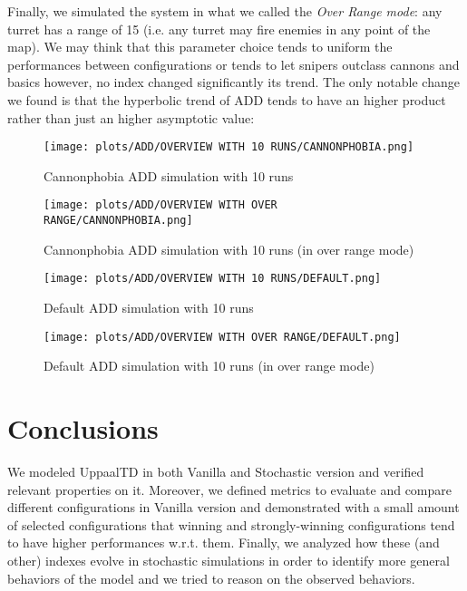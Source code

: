 \documentclass[
10pt, %
a4paper, %
oneside, %
headinclude,footinclude, %
BCOR5mm, %
]{scrartcl}
\begin{document}
			Finally, we simulated the system in what we called the \emph{Over Range mode}: any turret has a range of 15 (i.e. any turret may fire enemies in any point of the map). We may think that this parameter choice tends to uniform the performances between configurations or tends to let snipers outclass cannons and basics however, no index changed significantly its trend. The only notable change we found is that the hyperbolic trend of ADD tends to have an higher product rather than just an higher asymptotic value:
			\begin{figure}[H]
				\centering
				\begin{minipage}{.4\textwidth}
					\centering
					\texttt{[image: plots/ADD/OVERVIEW WITH 10 RUNS/CANNONPHOBIA.png]}
					\caption{Cannonphobia ADD simulation with 10 runs}
				\end{minipage}
				\begin{minipage}{.4\textwidth}
					\centering
					\texttt{[image: plots/ADD/OVERVIEW WITH OVER RANGE/CANNONPHOBIA.png]}
					\caption{Cannonphobia ADD simulation with 10 runs (in over range mode)}
				\end{minipage}
			\end{figure}
			\begin{figure}[H]
				\centering
				\begin{minipage}{.4\textwidth}
					\centering
					\texttt{[image: plots/ADD/OVERVIEW WITH 10 RUNS/DEFAULT.png]}
					\caption{Default ADD simulation with 10 runs}
				\end{minipage}
				\begin{minipage}{.4\textwidth}
					\centering
					\texttt{[image: plots/ADD/OVERVIEW WITH OVER RANGE/DEFAULT.png]}
					\caption{Default ADD simulation with 10 runs (in over range mode)}
				\end{minipage}
			\end{figure}
	\section{Conclusions}
		We modeled UppaalTD in both Vanilla and Stochastic version and verified relevant properties on it. Moreover, we defined metrics to evaluate and compare different configurations in Vanilla version and demonstrated with a small amount of selected configurations that winning and strongly-winning configurations tend to have higher performances w.r.t. them. Finally, we analyzed how these (and other) indexes evolve in stochastic simulations in order to identify more general behaviors of the model and we tried to reason on the observed behaviors.
	\newpage
	\appendix
\end{document}
